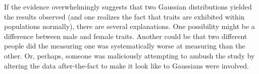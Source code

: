 \documentclass[12pt,twoside]{article}
\begin{document}
\begin{problems}
\begin{problemparts}
\problempart %

If the evidence overwhelmingly suggests that two Gaussian distributions yielded
the results observed (and one realizes the fact that traits are exhibited within
populations normally), there are several explanations. One possibility might be
a difference between male and female traits. Another could be that two different
people did the measuring one was systematically worse at measuring than the other.
Or, perhaps, someone was maliciously attempting to ambush the study by altering
the data after-the-fact to make it look like to Gaussians were involved.

\end{problemparts}

\end{problems}
\end{document}

